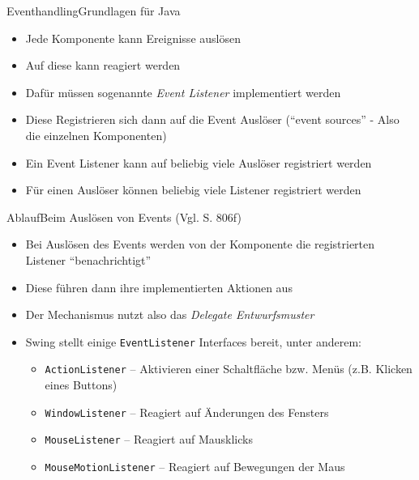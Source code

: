\begin{frame}{Eventhandling}{Grundlagen für Java}
    \begin{itemize} 
        \item Jede Komponente kann Ereignisse auslösen
        \item Auf diese kann reagiert werden
        \item Dafür müssen sogenannte \textit{Event Listener} implementiert werden
        \item Diese Registrieren sich dann auf die Event Auslöser ("`event sources"' - Also die einzelnen Komponenten)
        \item Ein Event Listener kann auf beliebig viele Auslöser registriert werden
        \item Für einen Auslöser können beliebig viele Listener registriert werden
    \end{itemize}
\end{frame}

\begin{frame}{Ablauf}{Beim Auslösen von Events (Vgl. \cite{ullenmboom2018} S. 806f)}
    \begin{itemize}
        \item Bei Auslösen des Events werden von der Komponente die registrierten Listener "`benachrichtigt"'
        \item Diese führen dann ihre implementierten Aktionen aus
        \item Der Mechanismus nutzt also das \textit{Delegate Entwurfsmuster}
        \item Swing stellt einige \texttt{EventListener} Interfaces bereit, unter anderem:
        \begin{itemize}
            \item \texttt{ActionListener} -- Aktivieren einer Schaltfläche bzw. Menüs (z.B. Klicken eines Buttons)
            \item \texttt{WindowListener} -- Reagiert auf Änderungen des Fensters
            \item \texttt{MouseListener} -- Reagiert auf Mausklicks
            \item \texttt{MouseMotionListener} -- Reagiert auf Bewegungen der Maus
        \end{itemize}
    \end{itemize}
\end{frame}

